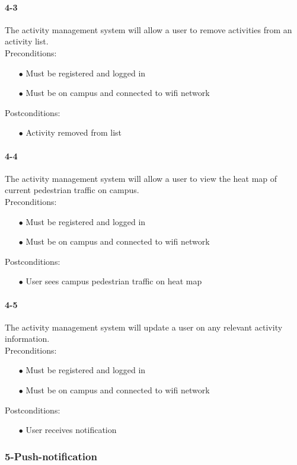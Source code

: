 \documentclass[a4paper,12pt]{article}
\begin{document}
\paragraph{4-3}
The activity management system will allow a user to remove activities from an activity list.\\
Preconditions:
\begin{itemize}
	\item[$\bullet$] Must be registered and logged in
	\item[$\bullet$] Must be on campus and connected to wifi network
\end{itemize}
Postconditions:
\begin{itemize}
	\item[$\bullet$] Activity removed from list
\end{itemize}
\paragraph{4-4}
The activity management system will allow a user to view the heat map of current pedestrian traffic on campus.\\
Preconditions:
\begin{itemize}
	\item[$\bullet$] Must be registered and logged in
	\item[$\bullet$] Must be on campus and connected to wifi network
\end{itemize}
Postconditions:
\begin{itemize}
	\item[$\bullet$] User sees campus pedestrian traffic on heat map
\end{itemize}
\paragraph{4-5}
The activity management system will update a user on any relevant activity information.\\
Preconditions:
\begin{itemize}
	\item[$\bullet$] Must be registered and logged in
	\item[$\bullet$] Must be on campus and connected to wifi network
\end{itemize}
Postconditions:
\begin{itemize}
	\item[$\bullet$] User receives notification
\end{itemize}
\subsubsection{5-Push-notification}
\end{document}
